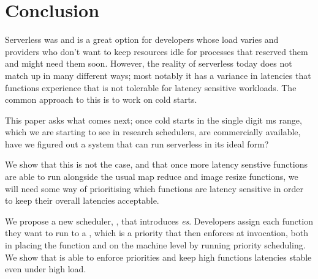 \section{Conclusion}


Serverless was and is a great option for developers whose load varies and
providers who don't want to keep resources idle for processes that reserved them
and might need them soon. However, the reality of serverless today does not
match up in many different ways; most notably it has a variance in latencies
that functions experience that is not tolerable for latency sensitive workloads.
The common approach to this is to work on cold starts. 

This paper asks what comes next; once cold starts in the single digit ms range,
which we are starting to see in research schedulers, are commercially available,
have we figured out a system that can run serverless in its ideal form?

We show that this is not the case, and that once more latency senstive functions
are able to run alongside the usual map reduce and image resize functions, we
will need some way of prioritising which functions are latency sensitive in
order to keep their overall latencies acceptable.

We propose a new scheduler, \sys{}, that introduces \emph{\priceclass{}es}.
Developers assign each function they want to run to a \priceclass{}, which is a
priority that \sys{} then enforces at invocation, both in placing the function
and on the machine level by running priority scheduling. We show that \sys{} is
able to enforce priorities and keep high \class{} functions latencies stable
even under high load.